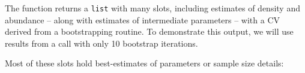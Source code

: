 \documentclass[
]{book}
\newenvironment{Shaded}{\begin{snugshade}}{\end{snugshade}}
\newcommand{\DecValTok}[1]{\textcolor[rgb]{0.00,0.00,0.81}{#1}}
\newcommand{\NormalTok}[1]{#1}
\newcommand{\OperatorTok}[1]{\textcolor[rgb]{0.81,0.36,0.00}{\textbf{#1}}}
\newcommand{\StringTok}[1]{\textcolor[rgb]{0.31,0.60,0.02}{#1}}
\begin{document}
The function returns a \texttt{list} with many slots, including estimates of density and abundance -- along with estimates of intermediate parameters -- with a CV derived from a bootstrapping routine. To demonstrate this output, we will use results from a call with only 10 bootstrap iterations.

\begin{Shaded}
\end{Shaded}

Most of these slots hold best-estimates of parameters or sample size details:
\end{document}
